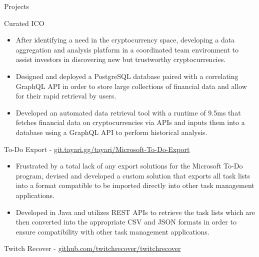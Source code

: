 \documentclass{article}
\newlength{\tabin}
\newlength{\secsep}
\newcommand{\lineunder}{\vspace*{-8pt} \\ \hspace*{-6pt} \hrulefill \\ \vspace*{-15pt}}
\newenvironment{tabbedsection}[1]{
  \begin{list}{}{
      \setlength{\itemsep}{0pt}
      \setlength{\labelsep}{0pt}
      \setlength{\labelwidth}{0pt}
      \setlength{\leftmargin}{\tabin}
      \setlength{\rightmargin}{\tabin}
      \setlength{\listparindent}{0pt}
      \setlength{\parsep}{0pt}
      \setlength{\parskip}{0pt}
      \setlength{\partopsep}{0pt}
      \setlength{\topsep}{#1}
    }
  \item[]
}{\end{list}}
\newenvironment{resume_section}[1]{
  \filbreak
  \vspace{2\secsep}
  \textsc{\color{blue}\large#1}
  \lineunder
  \begin{tabbedsection}{\secsep}
}{\end{tabbedsection}}
\newenvironment{resume_subsection}[2][]{
  \textbf{\color{BlueViolet}#2} \hfill {\normalsize #1} \hspace{-5em} 
  \begin{tabbedsection}{0.5\secsep}
}{\end{tabbedsection}}
\newenvironment{subitems}{
  \renewcommand{\labelitemi}{-}
  \begin{itemize}
      \setlength{\labelsep}{1em}
}{\end{itemize}}
\begin{document}
\vspace{2\secsep}

\begin{resume_section}{Projects}
	\begin{resume_subsection}{Curated ICO}
		\begin{subitems}
            \item After identifying a need in the cryptocurrency space, developing a data aggregation and analysis platform in a coordinated team environment to assist investors in discovering new but trustworthy cryptocurrencies.
            \item Designed and deployed a PostgreSQL database paired with a correlating GraphQL API in order to store large collections of financial data and allow for their rapid retrieval by users. 
            \item Developed an automated data retrieval tool with a runtime of 9.5ms that fetches financial data on cryptocurrencies via APIs and inputs them into a database using a GraphQL API to perform historical analysis. 
		\end{subitems}
	\end{resume_subsection}
	\vspace{2\secsep}
	\begin{resume_subsection}[(February 2021)]{To-Do Export - \faGitlab \hspace{0.01cm} \href{https://git.tayari.gg/tayari/Microsoft-To-Do-Export}{git.tayari.gg/tayari/Microsoft-To-Do-Export}}
  		\begin{subitems} 
            \item Frustrated by a total lack of any export solutions for the Microsoft To-Do program, devised and developed a custom solution that exports all task lists into a format compatible to be imported directly into other task management applications.
  			\item Developed in Java and utilizes REST APIs to retrieve the task lists which are then converted into the appropriate CSV and JSON formats in order to ensure compatibility with other task management applications.
    		\end{subitems}
  	\end{resume_subsection}
  	\vspace{2\secsep}
	\begin{resume_subsection}{Twitch Recover - \faGithub \hspace{0.01cm} \href{https://github.com/twitchrecover/twitchrecover}{github.com/twitchrecover/twitchrecover}}  

\end{resume_subsection}
\end{resume_section}
\end{document}
